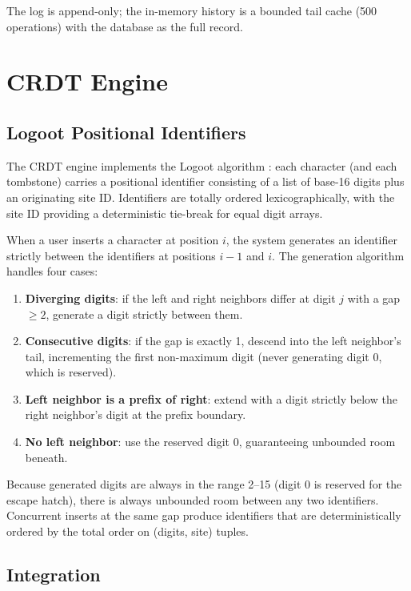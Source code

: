 \documentclass[conference]{IEEEtran}
\begin{document}
The log is append-only; the in-memory history is a bounded tail cache (500 operations) with the database as the full record.

\section{CRDT Engine}\label{sec:crdt}

\subsection{Logoot Positional Identifiers}

The CRDT engine implements the Logoot algorithm \cite{weiss2009}: each character (and each tombstone) carries a positional identifier consisting of a list of base-16 digits plus an originating site ID. Identifiers are totally ordered lexicographically, with the site ID providing a deterministic tie-break for equal digit arrays.

When a user inserts a character at position $i$, the system generates an identifier strictly between the identifiers at positions $i-1$ and $i$. The generation algorithm handles four cases:
\begin{enumerate}
\item \textbf{Diverging digits}: if the left and right neighbors differ at digit $j$ with a gap $\geq 2$, generate a digit strictly between them.
\item \textbf{Consecutive digits}: if the gap is exactly 1, descend into the left neighbor's tail, incrementing the first non-maximum digit (never generating digit 0, which is reserved).
\item \textbf{Left neighbor is a prefix of right}: extend with a digit strictly below the right neighbor's digit at the prefix boundary.
\item \textbf{No left neighbor}: use the reserved digit 0, guaranteeing unbounded room beneath.
\end{enumerate}

Because generated digits are always in the range 2--15 (digit 0 is reserved for the escape hatch), there is always unbounded room between any two identifiers. Concurrent inserts at the same gap produce identifiers that are deterministically ordered by the total order on (digits, site) tuples.

\subsection{Integration}
\end{document}

